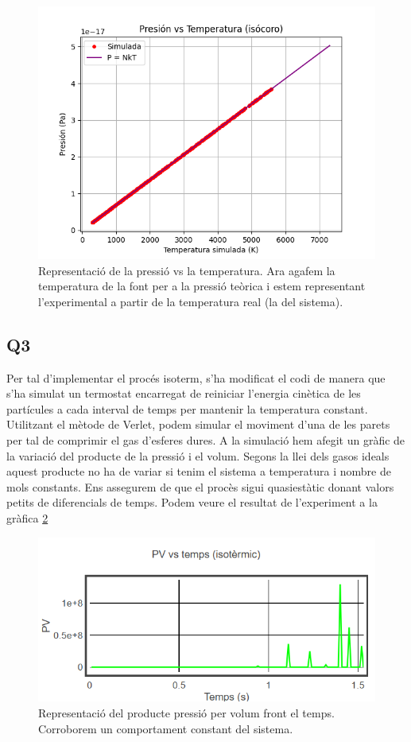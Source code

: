 \documentclass{article}
\begin{document}
	\begin{figure}[h!]
		\centering
		\includegraphics[width=0.7\linewidth]{Q2_2.png}
		\caption{Representació de la pressió vs la temperatura. Ara agafem la temperatura de la font per a la pressió teòrica i estem representant l'experimental a partir de la temperatura real (la del sistema). }
		\label{4}
	\end{figure}
	
	
	\subsection*{Q3}
	Per tal d'implementar el procés isoterm, s'ha modificat el codi de manera que s'ha simulat un termostat encarregat de reiniciar l'energia cinètica de les partícules a cada interval de temps per mantenir la temperatura constant. Utilitzant el mètode de Verlet, podem simular el moviment d'una de les parets per tal de comprimir el gas d'esferes dures. A la simulació hem afegit un gràfic de la variació del producte de la pressió i el volum. Segons la llei dels gasos ideals aquest producte no ha de variar si tenim el sistema a temperatura i nombre de mols constants. Ens assegurem de que el procès sigui quasiestàtic donant valors petits de diferencials de temps. Podem veure el resultat de l'experiment a la gràfica \ref{cacafuti}
	
	\begin{figure}[h!]
		\centering
		\includegraphics[width=0.7\linewidth]{Q3.png}
		\caption{Representació del producte pressió per volum front el temps. Corroborem un comportament constant del sistema.}
		\label{cacafuti}
	\end{figure}
	
\end{document}

